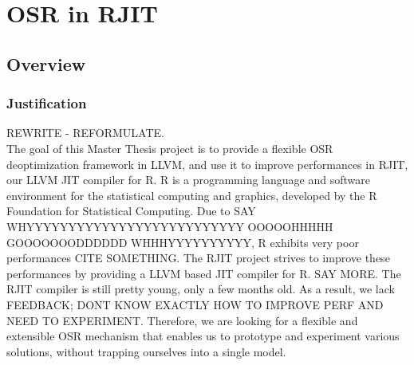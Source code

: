 
\chapter{OSR in RJIT} %

\label{Chapter4} %


\newcommand{\keyword}[1]{\textbf{#1}}
\newcommand{\tabhead}[1]{\textbf{#1}}
\newcommand{\code}[1]{\texttt{#1}}
\newcommand{\file}[1]{\texttt{\bfseries#1}}
\newcommand{\option}[1]{\texttt{\itshape#1}}

\section{Overview}
\subsection{Justification}

REWRITE - REFORMULATE.\\
            

The goal of this Master Thesis project is to provide a flexible OSR deoptimization framework in LLVM, and use it to improve performances in RJIT, our LLVM JIT compiler for R.
R is a programming language and software environment for the statistical computing and graphics, developed by the R Foundation for Statistical Computing\cite{RURL}.
Due to SAY WHYYYYYYYYYYYYYYYYYYYYYYYYYY OOOOOHHHHH GOOOOOOODDDDDD WHHHYYYYYYYYYY, R exhibits very poor performances CITE SOMETHING.
The RJIT project strives to improve these performances by providing a LLVM based JIT compiler for R. SAY MORE.
The RJIT compiler is still pretty young, only a few months old.
As a result, we lack FEEDBACK; DONT KNOW EXACTLY HOW TO IMPROVE PERF AND NEED TO EXPERIMENT.
Therefore, we are looking for a flexible and extensible OSR mechanism that enables us to prototype and experiment various solutions, without trapping ourselves into a single model.\\

